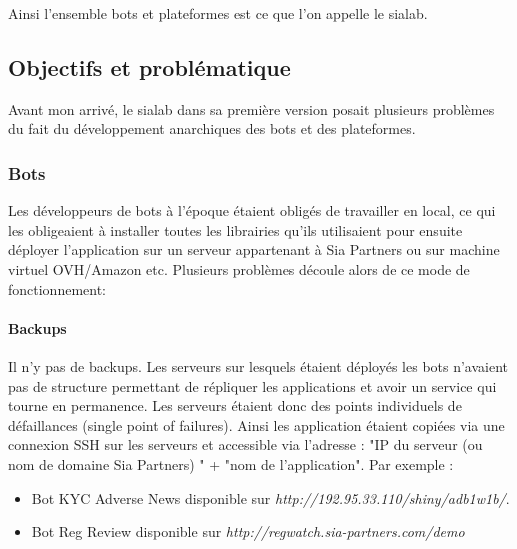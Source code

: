 \documentclass{article} %
\begin{document}
Ainsi l'ensemble bots et plateformes est ce que l'on appelle le sialab. 

\subsection{Objectifs et problématique}
Avant mon arrivé, le sialab dans sa première version posait plusieurs problèmes du fait du développement anarchiques des bots et des plateformes.

\subsubsection{Bots\\}
Les développeurs de bots à l'époque étaient obligés de travailler en local, ce qui les obligeaient à installer toutes les librairies qu'ils utilisaient pour ensuite déployer l'application sur un serveur appartenant à Sia Partners ou sur machine virtuel OVH/Amazon etc. Plusieurs problèmes découle alors de ce mode de fonctionnement:

\paragraph{Backups}
Il n'y pas de backups. Les serveurs sur lesquels étaient déployés les bots n'avaient pas de structure permettant de répliquer les applications et avoir un service qui tourne en permanence. Les serveurs étaient donc des points individuels de défaillances (single point of failures). Ainsi les application étaient copiées via une connexion SSH sur les serveurs et accessible via l'adresse : "IP du serveur (ou nom de domaine Sia Partners) " + "nom de l'application". Par exemple : 
\begin{itemize}
	\item Bot KYC Adverse News disponible sur \textit{http://192.95.33.110/shiny/adb1w1b/}.
	\item Bot Reg Review disponible sur \textit{http://regwatch.sia-partners.com/demo}
\end{itemize}
\end{document}
